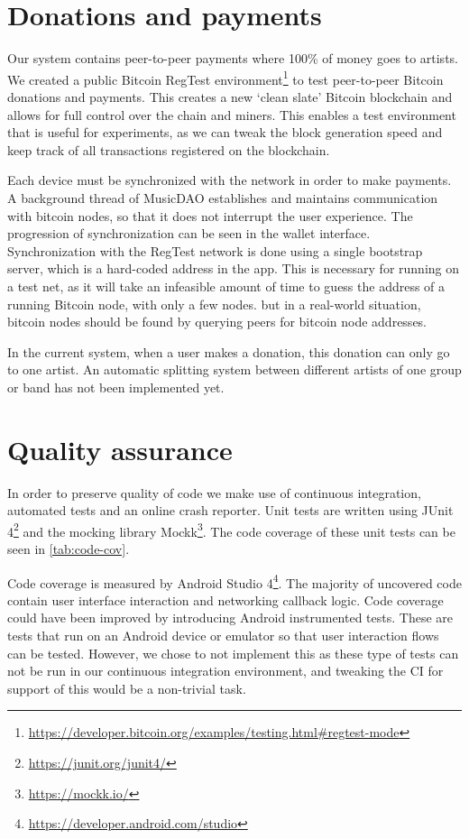 \section{Donations and payments}
\label{sec:regtest-network-impl}
Our system contains peer-to-peer payments where 100\% of money goes to artists. We created a public Bitcoin RegTest environment\footnote{\url{https://developer.bitcoin.org/examples/testing.html\#regtest-mode}} to test peer-to-peer Bitcoin donations and payments. This creates a new `clean slate' Bitcoin blockchain and allows for full control over the chain and miners. This enables a test environment that is useful for experiments, as we can tweak the block generation speed and keep track of all transactions registered on the blockchain. 

Each device must be synchronized with the network in order to make payments. A background thread of MusicDAO establishes and maintains communication with bitcoin nodes, so that it does not interrupt the user experience. The progression of synchronization can be seen in the wallet interface. Synchronization with the RegTest network is done using a single bootstrap server, which is a hard-coded address in the app. This is necessary for running on a test net, as it will take an infeasible amount of time to guess the address of a running Bitcoin node, with only a few nodes. but in a real-world situation, bitcoin nodes should be found by querying peers for bitcoin node addresses.

In the current system, when a user makes a donation, this donation can only go to one artist. An automatic splitting system between different artists of one group or band has not been implemented yet.

\section{Quality assurance}
In order to preserve quality of code we make use of continuous integration, automated tests and an online crash reporter. Unit tests are written using JUnit 4\footnote{\url{https://junit.org/junit4/}} and the mocking library Mockk\footnote{\url{https://mockk.io/}}. The code coverage of these unit tests can be seen in \ref{tab:code-cov}. 

Code coverage is measured by Android Studio 4\footnote{\url{https://developer.android.com/studio}}. The majority of uncovered code contain user interface interaction and networking callback logic. Code coverage could have been improved by introducing Android instrumented tests. These are tests that run on an Android device or emulator so that user interaction flows can be tested. However, we chose to not implement this as these type of tests can not be run in our continuous integration environment, and tweaking the CI for support of this would be a non-trivial task.

